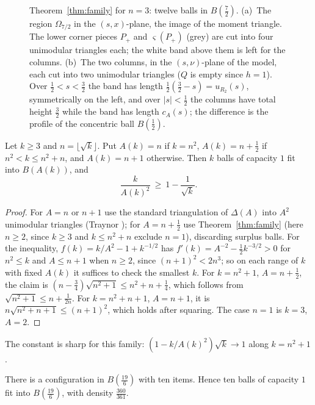 \documentclass[11pt]{amsart}
\begin{document}
\begin{figure}[t]
\caption{Theorem~\ref{thm:family} for $n=3$: twelve balls in $B(\frac72)$. (a)~The region $\Omega_{7/2}$ in the
$(s,x)$-plane, the image of the moment triangle. The lower corner pieces $P_+$ and $\varsigma(P_+)$ (grey) are cut
into four unimodular triangles each; the white band above them is left for the columns. (b)~The two columns, in
the $(s,\nu)$-plane of the model, each cut into two unimodular triangles ($Q$ is empty since $h=1$). Over
$\frac12<s<\frac32$ the band has length $\frac12(\frac32-s)=u_{R_2}(s)$, symmetrically on the left, and over
$|s|<\frac12$ the columns have total height $\frac32$ while the band has length $c_A(s)$; the difference is the
profile of the concentric ball $B(\frac12)$.}
\label{fig:family}
\end{figure}

\begin{corollary}\label{cor:allk}
Let $k\ge3$ and $n=\lfloor\sqrt k\rfloor$. Put $A(k)=n$ if $k=n^2$, $A(k)=n+\frac12$ if $n^2<k\le n^2+n$, and
$A(k)=n+1$ otherwise. Then $k$ balls of capacity $1$ fit into $B(A(k))$, and
\[
\frac{k}{A(k)^2}\ \ge\ 1-\frac1{\sqrt k}.
\]
\end{corollary}

\begin{proof}
For $A=n$ or $n+1$ use the standard triangulation of $\Delta(A)$ into $A^2$ unimodular triangles (Traynor
\cite{Traynor1995}); for $A=n+\frac12$ use Theorem~\ref{thm:family} (here $n\ge2$, since $k\ge3$ and $k\le n^2+n$
exclude $n=1$), discarding surplus balls. For the inequality, $f(k)=k/A^2-1+k^{-1/2}$ has
$f'(k)=A^{-2}-\frac12k^{-3/2}>0$ for $n^2\le k$ and $A\le n+1$ when $n\ge2$, since $(n+1)^2<2n^3$; so on each range
of $k$ with fixed $A(k)$ it suffices to check the smallest $k$. For $k=n^2+1$, $A=n+\frac12$, the claim is
$(n-\frac34)\sqrt{n^2+1}\le n^2+n+\frac14$, which follows from $\sqrt{n^2+1}\le n+\frac1{2n}$. For $k=n^2+n+1$,
$A=n+1$, it is $n\sqrt{n^2+n+1}\le(n+1)^2$, which holds after squaring. The case $n=1$ is $k=3$, $A=2$.
\end{proof}

The constant is sharp for this family: $(1-k/A(k)^2)\sqrt k\to1$ along $k=n^2+1$.

\begin{proposition}\label{prop:ten}
There is a configuration in $B(\frac{19}6)$ with ten items. Hence ten balls of capacity $1$ fit into
$B(\frac{19}{6})$, with density $\frac{360}{361}$.
\end{proposition}
\end{document}
